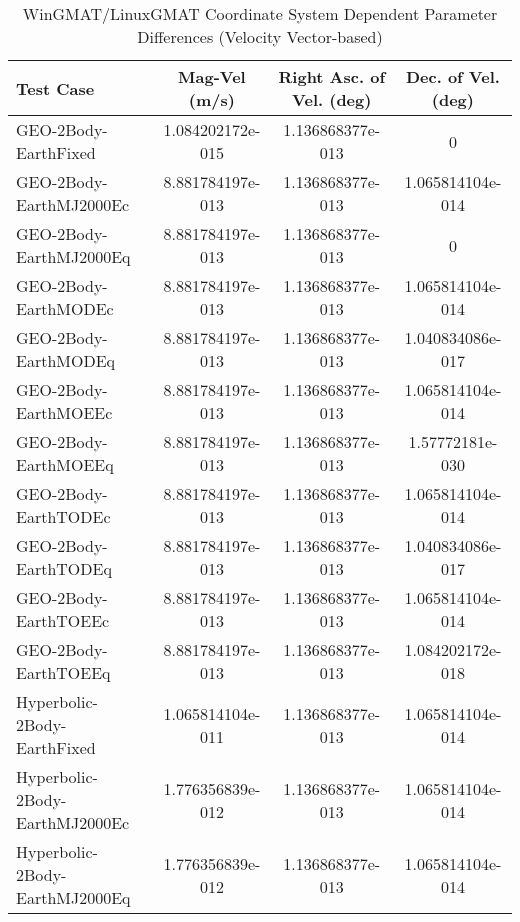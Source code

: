 \begin{table}[htbp!]
\centering
\caption{ WinGMAT/LinuxGMAT Coordinate System Dependent Parameter Differences (Velocity Vector-based)}
      \begin{tabular}{lccc}
      \hline\hline
          Test Case & Mag-Vel (m/s) & Right Asc. of Vel. (deg) & Dec. of Vel. (deg) \\
         \hline
         GEO-2Body-EarthFixed & 1.084202172e-015 & 1.136868377e-013 & 0 \\
         GEO-2Body-EarthMJ2000Ec & 8.881784197e-013 & 1.136868377e-013 & 1.065814104e-014 \\
         GEO-2Body-EarthMJ2000Eq & 8.881784197e-013 & 1.136868377e-013 & 0 \\
         GEO-2Body-EarthMODEc & 8.881784197e-013 & 1.136868377e-013 & 1.065814104e-014 \\
         GEO-2Body-EarthMODEq & 8.881784197e-013 & 1.136868377e-013 & 1.040834086e-017 \\
         GEO-2Body-EarthMOEEc & 8.881784197e-013 & 1.136868377e-013 & 1.065814104e-014 \\
         GEO-2Body-EarthMOEEq & 8.881784197e-013 & 1.136868377e-013 & 1.57772181e-030 \\
         GEO-2Body-EarthTODEc & 8.881784197e-013 & 1.136868377e-013 & 1.065814104e-014 \\
         GEO-2Body-EarthTODEq & 8.881784197e-013 & 1.136868377e-013 & 1.040834086e-017 \\
         GEO-2Body-EarthTOEEc & 8.881784197e-013 & 1.136868377e-013 & 1.065814104e-014 \\
         GEO-2Body-EarthTOEEq & 8.881784197e-013 & 1.136868377e-013 & 1.084202172e-018 \\
         Hyperbolic-2Body-EarthFixed & 1.065814104e-011 & 1.136868377e-013 & 1.065814104e-014 \\
         Hyperbolic-2Body-EarthMJ2000Ec & 1.776356839e-012 & 1.136868377e-013 & 1.065814104e-014 \\
         Hyperbolic-2Body-EarthMJ2000Eq & 1.776356839e-012 & 1.136868377e-013 & 1.065814104e-014 \\

\end{tabular}
\end{table}
